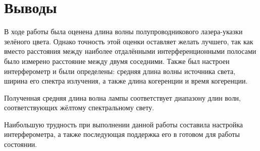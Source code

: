 \documentclass[12pt]{article}
\begin{document}
\section*{Выводы}
\par
	В ходе работы была оценена длина волны полупроводникового лазера-указки зелёного цвета. Однако точность этой оценки оставляет желать лучшего, так как вместо расстояния между наиболее отдалёнными интерференционными полосами было измерено расстояние между двумя соседними. Также был настроен интерферометр и были определены: средняя длина волны источника света, ширина его спектра излучения, а также длина когеренции и время когеренции.
\par
	Полученная средняя длина волна лампы соответствует диапазону длин волн, соответствующих жёлтому спектральному свету.
\par
	Наибольшую трудность при выполнении данной работы составила настройка интерферометра, а также последующая поддержка его в готовом для работы состоянии.
\end{document}
